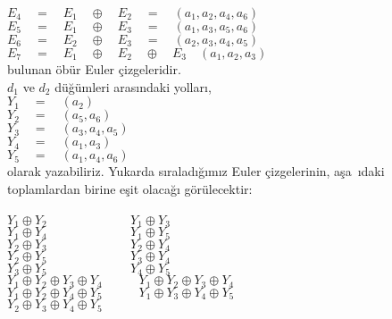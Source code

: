 \documentclass[11pt]{amsbook}
\begin{document}
\noindent$  E_{4}\quad=\quad E_{1}\quad \oplus \quad E_{2}\quad =\quad (a_{1},a_{2},a_{4},a_{6}) $ \\
$ E_{5}\quad=\quad E_{1}\quad \oplus \quad E_{3}\quad =\quad (a_{1},a_{3},a_{5},a_{6}) $ \\
$ E_{6}\quad=\quad E_{2}\quad \oplus \quad E_{3} \quad=\quad (a_{2},a_{3},a_{4},a_{5}) $ \\
$ E_{7}\quad=\quad E_{1}\quad \oplus \quad E_{2}\quad \oplus \quad E_{3} \quad (a_{1},a_{2},a_{3}) $ \\
 
 bulunan öbür Euler çizgeleridir. \\
$d_{1}$ ve $d_{2}$ düğümleri arasındaki yolları,  \\ 

\noindent$Y_{1}\quad=\quad (a_{2})$ \\
$Y_{2}\quad=\quad (a_{5},a_{6})$ \\
$Y_{3}\quad=\quad (a_{3},a_{4},a_{5})$ \\
$Y_{4}\quad=\quad (a_{1},a_{3})$ \\
$Y_{5}\quad=\quad (a_{1},a_{4},a_{6})$ \\

\noindent olarak yazabiliriz. Yukarda sıraladığımız Euler
çizgelerinin, aşa~ıdaki toplamlardan birine eşit
olacağı görülecektir: \\ \\

\indent$ Y_{1} \oplus Y_{2} \hspace{80pt} Y_{1} \oplus Y_{3} $ \\
\indent$ Y_{1} \oplus Y_{4} \hspace{80pt} Y_{1} \oplus Y_{5} $ \\
\indent$ Y_{2} \oplus Y_{3} \hspace{80pt} Y_{2} \oplus Y_{4} $ \\
\indent$ Y_{2} \oplus Y_{5} \hspace{80pt} Y_{3} \oplus Y_{4} $ \\
\indent$ Y_{3} \oplus Y_{5} \hspace{80pt} Y_{4} \oplus Y_{5} $ \\
\indent$ Y_{1} \oplus Y_{2} \oplus Y_{3} \oplus Y_{4} \hspace{35pt} Y_{1} \oplus Y_{2} \oplus Y_{3} \oplus Y_{4} $ \\
\indent$ Y_{1} \oplus Y_{2} \oplus Y_{4} \oplus Y_{5} \hspace{35pt} Y_{1} \oplus Y_{3} \oplus Y_{4} \oplus Y_{5} $ \\
\indent$ Y_{2} \oplus Y_{3} \oplus Y_{4} \oplus Y_{5}  $ \\
\end{document}
